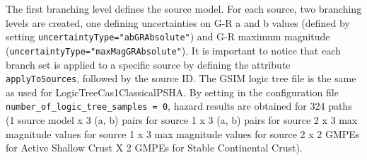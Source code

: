 The first branching level defines the source model. For each source, two branching levels are created, one defining
uncertainties on G-R a and b values (defined by setting \texttt{uncertaintyType="abGRAbsolute"}) and G-R maximum
magnitude (\texttt{uncertaintyType="maxMagGRAbsolute"}). It is important to notice that each branch set is applied
to a specific source by defining the attribute \texttt{applyToSources}, followed by the source ID. The GSIM logic tree file is
the same as used for LogicTreeCas1ClassicalPSHA. By setting in the configuration file \texttt{number\_\-of\_\-logic\_\-tree\_\-samples = 0},
hazard results are obtained for 324 paths (1 source model x 3 (a, b) pairs for source 1 x  3 (a, b) pairs for source 2 x 3 max magnitude values
for source 1 x 3 max magnitude values for source 2 x 2 GMPEs for Active Shallow Crust X 2 GMPEs for Stable Continental Crust).\\

